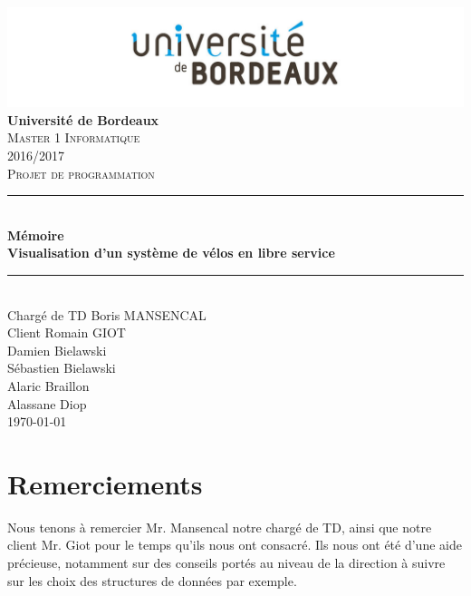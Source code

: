 \documentclass[12pt]{article}
\begin{document}
	\begin{titlepage}
		\includegraphics[scale=0.2]{logo_bordeaux.png}\\
		\centering
		\linebreak
		{\LARGE \bfseries Université de Bordeaux}\\ [2cm]
		\textsc{\Large Master 1 Informatique}\\ [0,3cm]
		\textsc{\Large 2016/2017}\\ [1,4cm]

		\textsc{\Large Projet de programmation}\\ [1.4cm]

		\rule{16cm}{1mm}\\ [0,7cm]
		{\huge \bfseries Mémoire}\\ [0,5cm]
		{\huge \bfseries Visualisation d'un système de vélos en libre service} \\[0,7cm]
		\rule{16cm}{1mm}\\ [1cm]

		{\Large Chargé de TD Boris MANSENCAL }\\ [0,3cm]
		{\Large Client Romain GIOT }\\ [1cm]

		{\Large Damien Bielawski }\\ [0,3cm]
		{\Large Sébastien Bielawski }\\[0,3cm]
		{\Large Alaric Braillon }\\ [0,3cm]
		{\Large Alassane Diop }\\ [2cm]
		\Large\today

	\end{titlepage}

 
\tableofcontents \newpage

\section*{Remerciements} 
	Nous tenons à remercier Mr. Mansencal notre chargé de TD, ainsi que notre client Mr. Giot
	pour le temps qu'ils nous ont consacré. Ils nous ont été d'une aide précieuse, notamment
	sur des conseils portés au niveau de la direction à suivre sur les choix des structures de
	données	par exemple.
	
\end{document}
